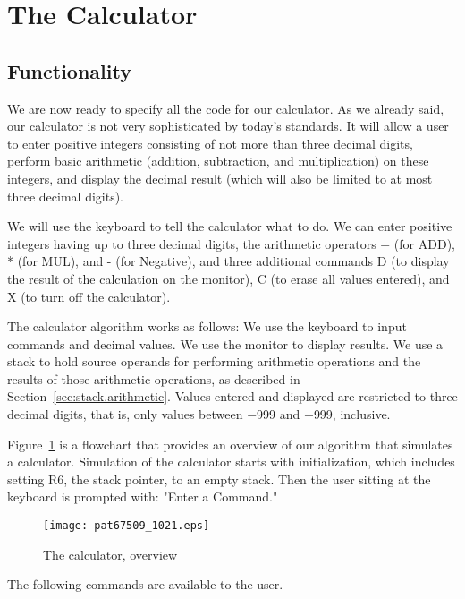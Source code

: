 \documentclass{patt}
\begin{document}
\FloatBarrier
\section{The Calculator}
\subsection{Functionality}

We are now ready to specify all the code for our calculator.  As we already 
said, our calculator is not very sophisticated by today's standards.  It will 
allow a user to enter positive integers consisting of not more 
than three decimal digits, perform basic arithmetic (addition, subtraction, 
and multiplication) on these integers, and display the decimal result (which 
will also be limited to at most three decimal digits).

We will use the keyboard to tell the calculator what to do.  We can enter
positive integers having up to three decimal digits, the arithmetic
operators + (for ADD), * (for MUL), and - (for Negative), and three additional
commands D (to display the result of the calculation on the monitor), C (to 
erase all values entered), and X (to turn off the calculator).

The calculator algorithm works as follows: We use the keyboard to input 
commands and decimal values.  We use the monitor to display results.  We use a
stack to hold source operands for performing arithmetic operations and the
results of those arithmetic operations, as described in
Section~\ref{sec:stack.arithmetic}.  Values entered and displayed
are restricted to three decimal digits, that is, only values between
$-$999 and $+$999, inclusive.  

Figure~\ref{fig:calculator.overview} is a flowchart that provides an
overview of our algorithm that simulates a calculator. Simulation of the 
calculator starts with initialization, which includes setting R6, the stack
pointer, to an empty stack.  Then the user sitting at the keyboard is
prompted with: "Enter a Command."  

\begin{figure}[h!]
\centerline{\texttt{[image: pat67509\_1021.eps]}}
\caption{The calculator, overview}
\label{fig:calculator.overview}
\end{figure}

\FloatBarrier
The following commands are available to the user.
\end{document}
